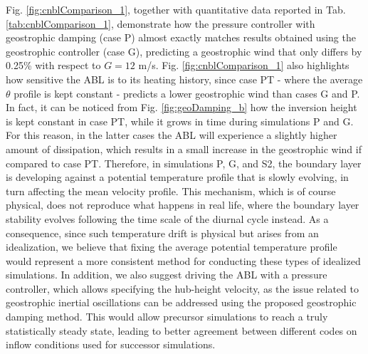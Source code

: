 \documentclass[journal abbreviation, manuscript]{copernicus}
\begin{document}
Fig. \ref{fig:cnblComparison_1}, together with quantitative data reported in Tab. \ref{tab:cnblComparison_1}, demonstrate how the pressure controller with geostrophic damping (case P) almost exactly matches results obtained using the geostrophic controller (case G), predicting a geostrophic wind that only differs by 0.25\% with respect to $G=12$ m/s. Fig. \ref{fig:cnblComparison_1} also highlights how sensitive the ABL is to its heating history, since case PT - where the average $\theta$ profile is kept constant - predicts a lower geostrophic wind than cases G and P. In fact, it can be noticed from Fig. \ref{fig:geoDamping_b} how the inversion height is kept constant in case PT, while it grows in time during simulations P and G. For this reason, in the latter cases the ABL will experience a slightly higher amount of dissipation, which results in a small increase in the geostrophic wind if compared to case PT. Therefore, in simulations P, G, and S2, the boundary layer is developing against a potential temperature profile that is slowly evolving, in turn affecting the mean velocity profile. This mechanism, which is of course physical, does not reproduce what happens in real life, where the boundary layer stability evolves following the time scale of the diurnal cycle instead. As a consequence, since such temperature drift is physical but arises from an idealization, we believe that fixing the average potential temperature profile would represent a more consistent method for conducting these types of idealized simulations. In addition, we also suggest driving the ABL with a pressure controller, which allows specifying the hub-height velocity, as the issue related to geostrophic inertial oscillations can be addressed using the proposed geostrophic damping method. This would allow precursor simulations to reach a truly statistically steady state, leading to better agreement between different codes on inflow conditions used for successor simulations.
\end{document}
